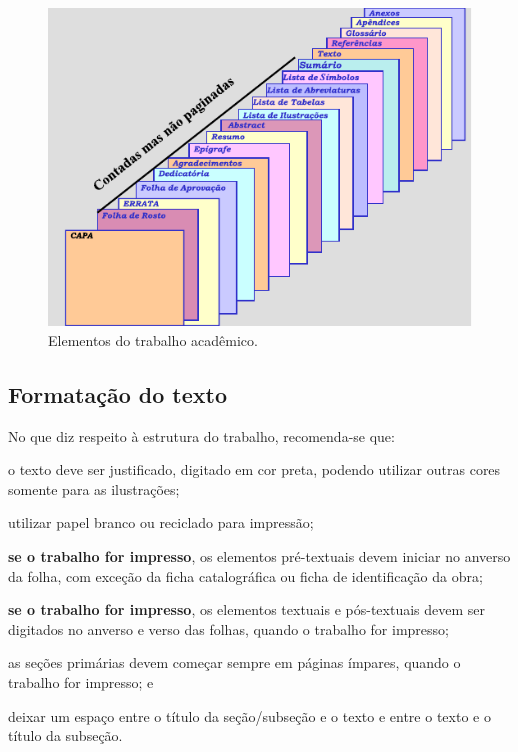 \begin{figure}[htb]
	\caption{\label{fig:Fig_1}Elementos do trabalho acadêmico.}
	\begin{center}
		\includegraphics{images/imagem.pdf}
	\end{center}
\end{figure}

\subsection{Formatação do texto}

No que diz respeito à estrutura do trabalho, recomenda-se que:
\begin{alineas}
	\item o texto deve ser justificado, digitado em cor preta, podendo utilizar outras cores somente para as ilustrações;
	\item utilizar papel branco ou reciclado para impressão;
	\item  \textbf{se o trabalho for impresso}, os elementos pré-textuais devem iniciar no anverso da folha, com exceção da ficha catalográfica ou ficha de identificação da obra;
	\item \textbf{se o trabalho for impresso}, os elementos textuais e pós-textuais devem ser digitados no anverso e verso das folhas, quando o trabalho for impresso;

	\item as seções primárias devem começar sempre em páginas ímpares, quando o trabalho for impresso; e 
	\item deixar um espaço entre o título da seção/subseção e o texto e entre o texto e o título da subseção.
\end{alineas}

